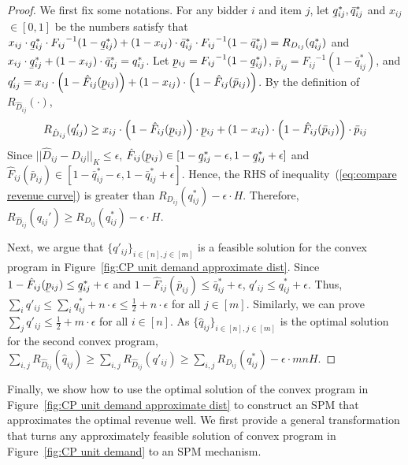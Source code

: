 \begin{proof}
	We first fix some notations. For any bidder $i$ and item $j$, let $\ubar{q}^*_{ij}, \bar{q}^*_{ij}$ and $x_{ij}$ $\in[0,1]$ be the numbers satisfy that $x_{ij}\cdot \ubar{q}^*_{ij}\cdot {F_{ij}}^{-1}(1-\ubar{q}^*_{ij}) +(1-x_{ij})\cdot \bar{q}^*_{ij}\cdot {F_{ij}}^{-1}(1-\bar{q}^*_{ij})=R_{D_{ij}}(q^*_{ij})$ and $x_{ij}\cdot \ubar{q}^*_{ij} +(1-x_{ij})\cdot \bar{q}^*_{ij}=q^*_{ij}$. Let $\ubar{p}_{ij} = {F_{ij}}^{-1}(1-\ubar{q}^*_{ij})$, $\bar{p}_{ij} = {F_{ij}}^{-1}(1-\bar{q}^*_{ij})$, and  $q'_{ij} = x_{ij}\cdot \left(1-\hat{F}_{ij}(\ubar{p}_{ij})\right)+(1-x_{ij})\cdot \left(1-\hat{F}_{ij}(\bar{p}_{ij})\right)$. By the definition of $R_{\hat{D}_{ij}}(\cdot)$, \begin{equation}\label{eq:compare revenue curve}
		R_{\hat{D}_{ij}}(q_{ij}')\geq x_{ij}\cdot \left(1-\hat{F}_{ij}(\ubar{p}_{ij})\right)\cdot \ubar{p}_{ij}+(1-x_{ij})\cdot \left(1-\hat{F}_{ij}(\bar{p}_{ij})\right)\cdot \bar{p}_{ij}
	\end{equation} Since $||\hat{D}_{ij}-D_{ij}||_K\leq \epsilon$, $\hat{F}_{ij}(\ubar{p}_{ij})\in [1-\ubar{q}^*_{ij}-\epsilon, 1-\ubar{q}^*_{ij}+\epsilon]$ and $\hat{F}_{ij}(\bar{p}_{ij}) \in [1-\bar{q}^*_{ij}-\epsilon, 1-\bar{q}^*_{ij}+\epsilon]$. Hence, the RHS of inequality~(\ref{eq:compare revenue curve}) is greater than $R_{D_{ij}}(q_{ij}^*)-\epsilon\cdot H$. Therefore, $R_{\hat{D}_{ij}}(q_{ij}')\geq R_{D_{ij}}(q_{ij}^*)-\epsilon\cdot H$.
	
	Next, we argue that $\{q'_{ij}\}_{i\in[n],j\in[m]}$ is a feasible solution for the convex program in Figure~\ref{fig:CP unit demand approximate dist}. Since $1-\hat{F}_{ij}(\ubar{p}_{ij})\leq \ubar{q}^*_{ij}+\epsilon$ and $1-\hat{F}_{ij}(\bar{p}_{ij})\leq \bar{q}^*_{ij}+\epsilon$, $q'_{ij}\leq q^*_{ij}+\epsilon$. Thus, $\sum_i q'_{ij} \leq \sum_i q^*_{ij} + n\cdot \epsilon \leq \frac{1}{2}+n\cdot \epsilon$ for all $j\in[m]$. Similarly, we can prove $\sum_j q'_{ij}\leq \frac{1}{2}+m\cdot \epsilon$ for all $i\in[n]$. As $\{\hat{q}_{ij}\}_{i\in[n],j\in[m]}$ is the optimal solution for the second convex program, $\sum_{i,j}R_{\hat{D}_{ij}}(\hat{q}_{ij})\geq \sum_{i,j}R_{\hat{D}_{ij}}({q}'_{ij})\geq \sum_{i,j}{R}_{D_{ij}}({q}^*_{ij})-\epsilon\cdot mn H$.
 \end{proof}

Finally, we show how to use the optimal solution of the convex program in Figure~\ref{fig:CP unit demand approximate dist} to construct an SPM that approximates the optimal revenue well. We first provide a general transformation that turns any approximately feasible solution of convex program in Figure~\ref{fig:CP unit demand} to an SPM mechanism.

